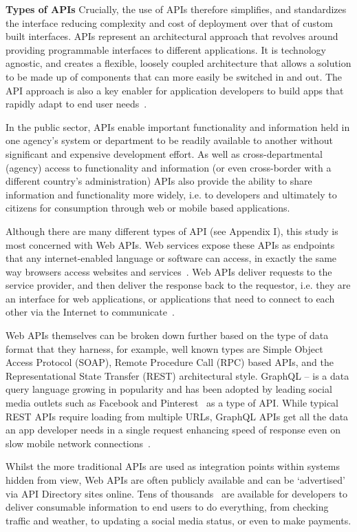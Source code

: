 \textbf{Types of APIs}
Crucially, the use of APIs therefore simplifies, and standardizes the interface
reducing complexity and cost of deployment over that of custom built interfaces.
APIs represent an architectural approach that revolves around providing
programmable interfaces to different applications. It is technology agnostic,
and creates a flexible, loosely coupled architecture that allows a solution to be
made up of components that can more easily be switched in and out. The API approach
is also a key enabler for application developers to build apps that rapidly adapt
to end user needs~\citep{hcl_tech}. 

In the public sector, APIs enable important functionality and information held in
one agency’s system or department to be readily available to another without
significant and expensive development effort. As well as cross-departmental
(agency) access to functionality and information (or even cross-border with a
different country’s administration) APIs also provide the ability to share
information and functionality more widely, i.e. to developers and ultimately
to citizens for consumption through web or mobile based applications.

Although there are many different types of API (see Appendix I), this study is
most concerned with Web APIs. Web services expose these APIs as endpoints that
any internet-enabled language or software can access, in exactly the same way
browsers access websites and services~\citep{fed_tech}. Web APIs deliver requests to the
service provider, and then deliver the response back to the requestor,
i.e. they are an interface for web applications, or applications that need to
connect to each other via the Internet to communicate~\citep{define_api}.

Web APIs themselves can be broken down further based on the type of data format
that they harness, for example, well known types are Simple Object Access Protocol
(SOAP), Remote Procedure Call (RPC) based APIs, and the Representational State
Transfer (REST) architectural style. GraphQL – is a data query language growing
in popularity and has been adopted by leading social media outlets such as Facebook
and Pinterest~\citep{graphql} as a type of API. While typical REST APIs require loading
from multiple URLs, GraphQL APIs get all the data an app developer needs in a single
request enhancing speed of response even on slow mobile network connections~\citep{graphql}.

Whilst the more traditional APIs are used as integration points within systems
hidden from view, Web APIs are often publicly available and can be ‘advertised’
via API Directory sites online. Tens of thousands~\citep{programmableweb_search} are available for developers
to deliver consumable information to end users to do everything, from checking
traffic and weather, to updating a social media status, or even to make payments.

